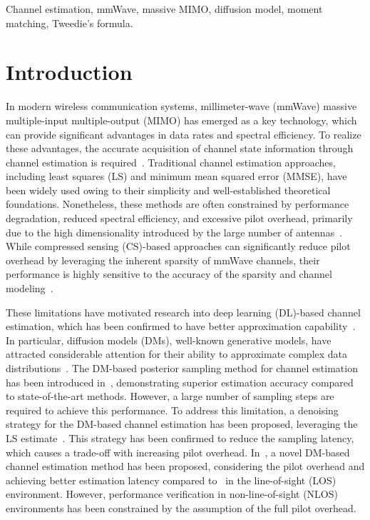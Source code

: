 \documentclass[lettersize,journal]{IEEEtran}
\begin{document}
\begin{IEEEkeywords}
Channel estimation, mmWave, massive MIMO, diffusion model, moment matching, Tweedie's formula.
\end{IEEEkeywords}


\section{Introduction}

In modern wireless communication systems, millimeter-wave (mmWave) massive multiple-input multiple-output (MIMO) has emerged as a key technology, which can provide significant advantages in data rates and spectral efficiency. To realize these advantages, the accurate acquisition of channel state information through channel estimation is required~\cite{busariMillimeterWaveMassiveMIMO2018}. Traditional channel estimation approaches, including least squares (LS) and minimum mean squared error (MMSE), have been widely used owing to their simplicity and well-established theoretical foundations. Nonetheless, these methods are often constrained by performance degradation, reduced spectral efficiency, and excessive pilot overhead, primarily due to the high dimensionality introduced by the large number of antennas~\cite{hassibiHowMuchTraining2003}. While compressed sensing (CS)-based approaches can significantly reduce pilot overhead by leveraging the inherent sparsity of mmWave channels, their performance is highly sensitive to the accuracy of the sparsity and channel modeling~\cite{zhangAtomicNormDenoisingBased2018,mendez-rialHybridMIMOArchitectures2016,choiCompressedSensingWireless2017}.

These limitations have motivated research into deep learning (DL)-based channel estimation, which has been confirmed to have better approximation capability~\cite{kimDeepLearningaidedWireless2023, heDeepLearningBasedChannel2018}. In particular, diffusion models (DMs), well-known generative models, have attracted considerable attention for their ability to approximate complex data distributions~\cite{arvinteMIMOChannelEstimation2023,feslDiffusionBasedGenerativePrior2024,zhouGenerativeDiffusionModels2025}. The DM-based posterior sampling method for channel estimation has been introduced in~\cite{arvinteMIMOChannelEstimation2023}, demonstrating superior estimation accuracy compared to state-of-the-art methods. However, a large number of sampling steps are required to achieve this performance. To address this limitation, a denoising strategy for the DM-based channel estimation has been proposed, leveraging the LS estimate~\cite{feslDiffusionBasedGenerativePrior2024}. This strategy has been confirmed to reduce the sampling latency, which causes a trade-off with increasing pilot overhead. In~\cite{zhouGenerativeDiffusionModels2025}, a novel DM-based channel estimation method has been proposed, considering the pilot overhead and achieving better estimation latency compared to~\cite{arvinteMIMOChannelEstimation2023} in the line-of-sight (LOS) environment. However, performance verification in non-line-of-sight (NLOS) environments has been constrained by the assumption of the full pilot overhead.
\end{document}

